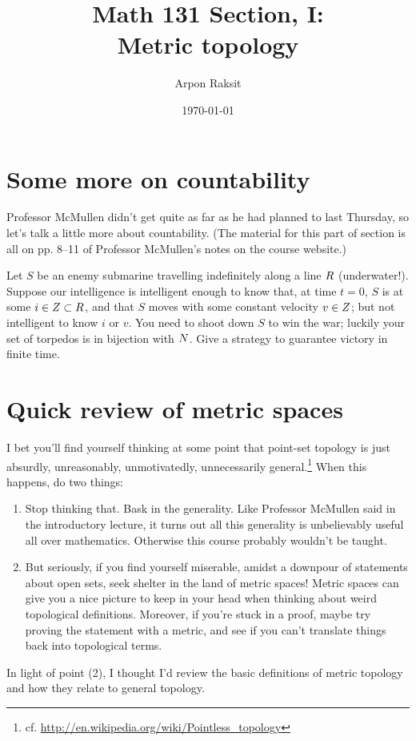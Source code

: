 


\title{Math 131 Section, I:\\Metric topology}
\author{Arpon Raksit}
\date{\today}


\maketitle
\thispagestyle{fancy}


\section{Some more on countability}

Professor McMullen didn't get quite as far as he had planned to last
Thursday, so let's talk a little more about countability. (The
material for this part of section is all on pp. 8--11 of Professor
McMullen's notes on the course website.)

\begin{exercise}
  Let $S$ be an enemy submarine travelling indefinitely along a line
  $R$ (underwater!). Suppose our intelligence is intelligent enough
  to know that, at time $t=0$, $S$ is at some $i \in Z \subset R$,
  and that $S$ moves with some constant velocity $v \in Z$; but not
  intelligent to know $i$ or $v$. You need to shoot down $S$ to win
  the war; luckily your set of torpedos is in bijection with
  $N$. Give a strategy to guarantee victory in finite time.
\end{exercise}


\section{Quick review of metric spaces}

I bet you'll find yourself thinking at some point that point-set
topology is just absurdly, unreasonably, unmotivatedly, unnecessarily
general.\footnote{cf.
  \url{http://en.wikipedia.org/wiki/Pointless_topology}} When this
happens, do two things:
\begin{enumerate}
\item Stop thinking that. Bask in the generality. Like Professor
  McMullen said in the introductory lecture, it turns out all this
  generality is unbelievably useful all over mathematics. Otherwise
  this course probably wouldn't be taught.
\item But seriously, if you find yourself miserable, amidst a downpour
  of statements about open sets, seek shelter in the land of metric
  spaces! Metric spaces can give you a nice picture to keep in your
  head when thinking about weird topological definitions. Moreover, if
  you're stuck in a proof, maybe try proving the statement with a
  metric, and see if you can't translate things back into topological
  terms.
\end{enumerate}
In light of point (2), I thought I'd review the basic definitions of
metric topology and how they relate to general topology.

